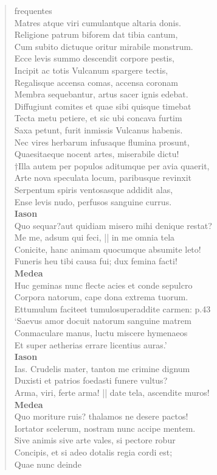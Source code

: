 \documentclass[11pt, a4paper]{report}
\begin{document}
\begin{verse}
frequentes \\ Matres atque viri cumulantque altaria donis. \\ Religione patrum biforem dat tibia cantum, \\ Cum subito dictuque oritur mirabile monstrum. \\ Ecce levis summo descendit corpore pestis, \\ Incipit ac totis Vulcanum spargere tectis, \\ Regalisque accensa comas, accensa coronam \\ Membra sequebantur, artus sacer ignis edebat. \\ Diffugiunt comites et quae sibi quisque timebat \\ Tecta metu petiere, et sic ubi concava furtim \\ Saxa petunt, furit inmissis Vulcanus habenis. \\ Nec vires herbarum infusaque flumina prosunt, \\ Quaesitaeque nocent artes, miserabile dictu! \\ †Illa autem per populos aditumque per avia quaerit, \\ Arte nova speculata locum, paribusque revinxit \\ Serpentum spiris ventosasque addidit alas, \\ Ense levis nudo, perfusos sanguine currus. \\ \textbf{Iason} \\Quo sequar?aut quidiam misero mihi denique restat? \\ Me me, adsum qui feci, || in me omnia tela \\ Conicite, hanc animam quocumque absumite leto! \\ Funeris heu tibi causa fui; dux femina facti! \\ \textbf{Medea} \\Huc geminas nunc flecte acies et conde sepulcro \\ Corpora natorum, cape dona extrema tuorum. \\ Ettumulum faciteet tumulosuperaddite carmen: p.43 \\ ‘Saevus amor docuit natorum sanguine matrem \\ Conmaculare manus, luctu miscere hymenaeos \\ Et super aetherias errare licentius auras.’ \\ \textbf{Iason} \\Ias. Crudelis mater, tanton me crimine dignum \\ Duxisti et patrios foedasti funere vultus? \\ Arma, viri, ferte arma! || date tela, ascendite muros! \\ \textbf{Medea} \\Quo moriture ruis? thalamos ne desere pactos! \\ Iortator scelerum, nostram nunc accipe mentem. \\ Sive animis sive arte vales,  \lbrack si pectore robur \\ Concipis, \rbrack  et si adeo dotalis regia cordi est; \\  \lbrack Quae nunc deinde 
\end{verse}
\end{document}
